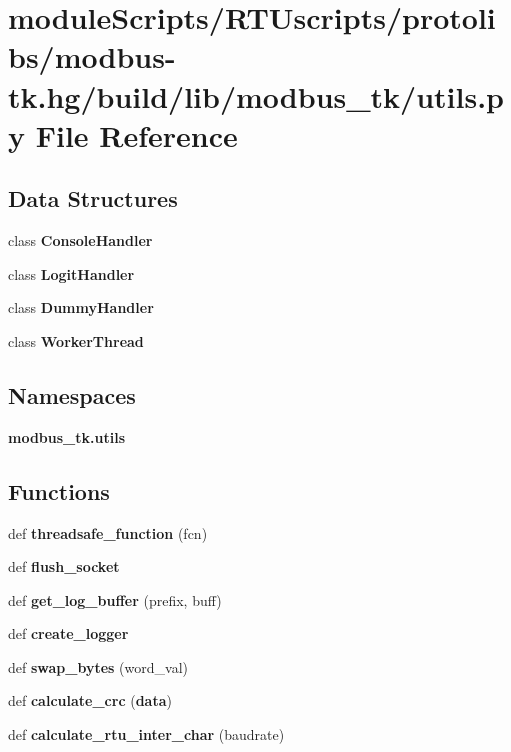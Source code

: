 \section{module\+Scripts/\+R\+T\+Uscripts/protolibs/modbus-\/tk.hg/build/lib/modbus\+\_\+tk/utils.py File Reference}
\label{modbus-tk_8hg_2build_2lib_2modbus__tk_2utils_8py}
\subsection*{Data Structures}
\begin{DoxyCompactItemize}
\item 
class {\bf Console\+Handler}
\item 
class {\bf Logit\+Handler}
\item 
class {\bf Dummy\+Handler}
\item 
class {\bf Worker\+Thread}
\end{DoxyCompactItemize}
\subsection*{Namespaces}
\begin{DoxyCompactItemize}
\item 
 {\bf modbus\+\_\+tk.\+utils}
\end{DoxyCompactItemize}
\subsection*{Functions}
\begin{DoxyCompactItemize}
\item 
def {\bf threadsafe\+\_\+function} (fcn)
\item 
def {\bf flush\+\_\+socket}
\item 
def {\bf get\+\_\+log\+\_\+buffer} (prefix, buff)
\item 
def {\bf create\+\_\+logger}
\item 
def {\bf swap\+\_\+bytes} (word\+\_\+val)
\item 
def {\bf calculate\+\_\+crc} ({\bf data})
\item 
def {\bf calculate\+\_\+rtu\+\_\+inter\+\_\+char} (baudrate)
\end{DoxyCompactItemize}

